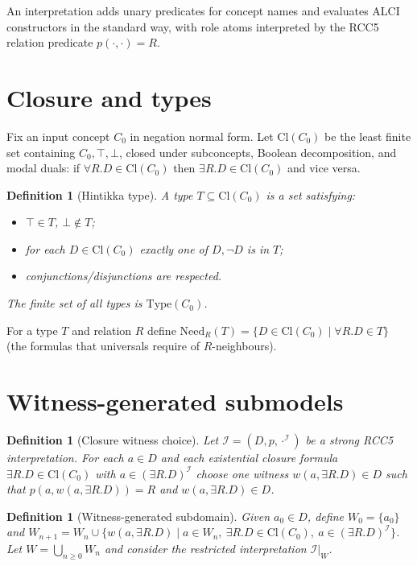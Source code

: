 \documentclass[11pt]{article}
\newcommand{\Cl}{\mathrm{Cl}}
\newtheorem{definition}[theorem]{Definition}
\begin{document}
An interpretation adds unary predicates for concept names and evaluates ALCI
constructors in the standard way, with role atoms interpreted by the RCC5
relation predicate $p(\cdot,\cdot)=R$.

\section{Closure and types}
\label{sec:closure}

Fix an input concept $C_0$ in negation normal form. Let $\Cl(C_0)$ be the
least finite set containing $C_0,\top,\bot$, closed under subconcepts,
Boolean decomposition, and modal duals: if $\forall R.D\in\Cl(C_0)$ then
$\exists R.D\in\Cl(C_0)$ and vice versa.

\begin{definition}[Hintikka type]
A \emph{type} $T\subseteq\Cl(C_0)$ is a set satisfying:
\begin{itemize}
  \item $\top\in T$, $\bot\notin T$;
  \item for each $D\in\Cl(C_0)$ exactly one of $D,\neg D$ is in $T$;
  \item conjunctions/disjunctions are respected.
\end{itemize}
The finite set of all types is $\mathrm{Type}(C_0)$.
\end{definition}

For a type $T$ and relation $R$ define
$\mathrm{Need}_R(T)=\{D\in\Cl(C_0)\mid \forall R.D\in T\}$ (the formulas that
universals require of $R$-neighbours).

\section{Witness-generated submodels}
\label{sec:witness}

\begin{definition}[Closure witness choice]
Let $\mathcal{I}=(D,p,\cdot^\mathcal{I})$ be a strong RCC5 interpretation.
For each $a\in D$ and each existential closure formula $\exists R.D\in\Cl(C_0)$
with $a\in(\exists R.D)^\mathcal{I}$ choose one witness $w(a,\exists R.D)\in D$
such that $p(a,w(a,\exists R.D))=R$ and $w(a,\exists R.D)\in D$.
\end{definition}

\begin{definition}[Witness-generated subdomain]
Given $a_0\in D$, define $W_0=\{a_0\}$ and
$W_{n+1}=W_n\cup\{w(a,\exists R.D)\mid a\in W_n,\ \exists R.D\in\Cl(C_0),\ a\in(\exists R.D)^\mathcal{I}\}$.
Let $W=\bigcup_{n\ge 0}W_n$ and consider the restricted interpretation
$\mathcal{I}|_W$.
\end{definition}
\end{document}

